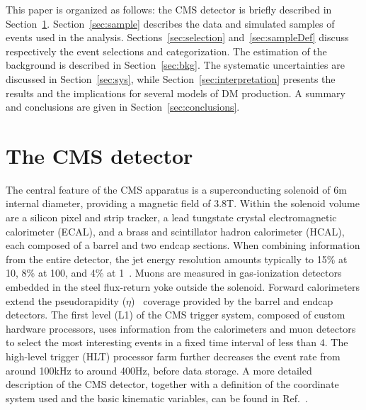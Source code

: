 {{This paper is organized as follows: the CMS detector is briefly described
in Section~\ref{cmsdetector}.  Section~\ref{sec:sample}
describes the data and simulated samples of events used in the
analysis. Sections~\ref{sec:selection} and~\ref{sec:sampleDef} discuss
respectively the event selections and categorization. The
estimation of the background is described in Section~\ref{sec:bkg}.
The systematic uncertainties are discussed in Section~\ref{sec:sys},
while Section~\ref{sec:interpretation} presents the results and the
implications for several models of DM production. A summary and
conclusions are given in Section~\ref{sec:conclusions}.

\section{The CMS detector}\label{cmsdetector}

The central feature of the CMS apparatus is a superconducting solenoid
of 6\unit{m} internal diameter, providing a magnetic field of
3.8\unit{T}. Within the solenoid volume are a silicon
pixel and strip tracker, a lead tungstate crystal electromagnetic
calorimeter (ECAL), and a brass and scintillator hadron calorimeter
(HCAL), each composed of a barrel and two endcap sections. 
When combining information from the entire detector, the jet energy resolution amounts typically to 15\% at 10\GeV, 8\% at 100\GeV, and 4\% at 1\TeV~\cite{Chatrchyan:2013dga}. Muons are
measured in gas-ionization detectors embedded in the steel flux-return
yoke outside the solenoid. Forward calorimeters extend the
pseudorapidity ($\eta$)~\cite{Chatrchyan:2008zzk} coverage provided by the
barrel and endcap detectors. The first level (L1) of the CMS trigger system, composed of custom
hardware processors, uses information from the calorimeters and muon
detectors to select the most interesting events in a fixed time
interval of less than 4\mus. The high-level trigger (HLT) processor
farm further decreases the event rate from around 100\unit{kHz} to
around 400\unit{Hz}, before data storage. A more
detailed description of the CMS detector, together with a definition
of the coordinate system used and the basic kinematic variables, can
be found in Ref.~\cite{Chatrchyan:2008zzk}.

}}
